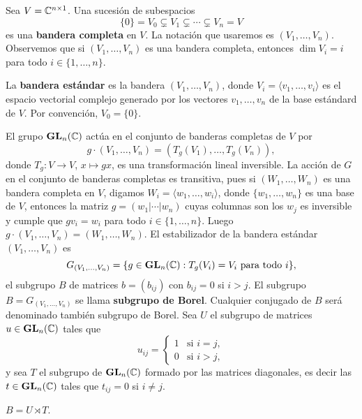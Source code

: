 Sea $V=\mathbb{C}^{n\times 1}$. Una sucesión de subespacios 
\[
\{0\}=V_0\subsetneq V_1\subsetneq \cdots\subsetneq V_n=V
\]
es una \textbf{bandera completa} en $V$. La notación que usaremos es $(V_1,\dots,V_n)$. Observemos
que si $(V_1,\dots,V_n)$ es una bandera completa, entonces $\dim V_i=i$ para todo $i\in\{1,\dots,n\}$. 

La \textbf{bandera estándar} es la bandera $(V_1,\dots,V_n)$, donde
$V_i=\langle v_1,\dots,v_i\rangle$ es el espacio vectorial complejo
generado por los vectores $v_1,\dots,v_n$ de la base estándard de $V$. 
Por convención, $V_0=\{0\}$. 

El grupo $\mathbf{GL}_n(\mathbb{C})$ actúa en el conjunto de banderas completas de $V$ por 
\[
g\cdot (V_1,\dots,V_n)=(T_g(V_1),\dots,T_g(V_n)),
\]
donde $T_g\colon V\to V$, $x\mapsto gx$, es una transformación lineal inversible. 
La acción de $G$ en el conjunto de banderas completas es transitiva, pues
si $(W_1,\dots,W_n)$ es una bandera completa en $V$, digamos
$W_i=\langle w_1,\dots,w_i\rangle$, donde $\{w_1,\dots,w_n\}$ es una base de $V$, entonces 
la matriz $g=(w_1|\cdots|w_n)$ cuyas columnas son los $w_j$ es inversible 
y cumple que
$gv_i=w_i$ para todo $i\in\{1,\dots,n\}$. Luego $g\cdot (V_1,\dots,V_n)=(W_1,\dots,W_n)$. 
El estabilizador de la bandera estándar $(V_1,\dots,V_n)$ es
\[
G_{(V_1,\dots,V_n)}=\{g\in\mathbf{GL}_n(\mathbb{C}):T_g(V_i)=V_i\text{ para todo $i$}\},
\]
el subgrupo $B$ de matrices $b=(b_{ij})$ con $b_{ij}=0$ si $i>j$. 
El subgrupo $B=G_{(V_1,\dots,V_n)}$ se llama \textbf{subgrupo de Borel}.
Cualquier conjugado de $B$ será denominado también subgrupo de Borel. 
Sea $U$ 
el subgrupo de matrices $u\in\mathbf{GL}_n(\mathbb{C})$ tales que 
\[
u_{ij}=\begin{cases}
1 & \text{si $i=j$},\\
0 & \text{si $i>j$},
\end{cases}
\]
y sea $T$ el subgrupo de $\mathbf{GL}_n(\mathbb{C})$ formado por las matrices diagonales, es decir
las $t\in\mathbf{GL}_n(\mathbb{C})$ tales que $t_{ij}=0$ si $i\ne j$. 

\begin{proposition}
$B=U\rtimes T$.	
\end{proposition}

